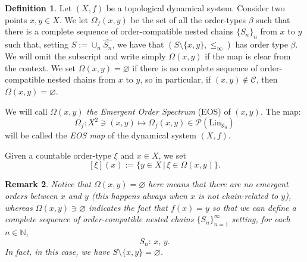 \documentclass[10pt,a4paper]{article}
\theoremstyle{definition}
\newtheorem{defi}{Definition}[section]
\theoremstyle{remark}
\theoremstyle{plain}
\newtheorem{rem}[defi]{Remark}
\begin{document}
\begin{defi}
    Let $(X,f)$ be a topological dynamical system. Consider two points $x,y\in X$. We let $\Omega_f(x,y)$ be the set of all the order-types $\beta$ such that there is a complete sequence of order-compatible nested chains $\{S_n\}_n$ from $x$ to $y$ such that, setting $S:=\cup_n \widehat{S_n}$, we have that $(S\setminus\{x,y\},\leq_\infty)$ has order type $\beta$. We will omit the subscript and write simply $\Omega(x,y)$ if the map is clear from the context. 
    We set $\Omega(x,y)=\varnothing$ if there is no complete sequence of order-compatible nested chains from $x$ to $y$, so in particular, if $(x,y)\notin\mathcal{C}$, then $\Omega(x,y)=\varnothing$.

    We will call $\Omega(x,y)$ \emph{the Emergent Order Spectrum} (EOS) of $(x,y)$.
    The map:
    \begin{equation}
        \Omega_f:X^2\ni (x,y)\mapsto \Omega_f(x,y)\in \mathcal{P}(\text{Lin}_{\aleph_0})
    \end{equation}
    will be called the \emph{EOS map} of the dynamical system $(X,f)$.

    Given a countable order-type $\xi$ and $x\in X$, we set $$[\xi](x):=\{y\in X\, |\, \xi\in\Omega(x,y)\}.$$

    
\end{defi}
\begin{rem}
    Notice that $\Omega(x,y)=\varnothing$ here means that there are no emergent orders between $x$ and $y$ (this happens always when $x$ is not chain-related to $y$), whereas $\Omega(x,y)\ni\varnothing$ indicates the fact that $f(x)=y$ so that we can define a complete sequence of order-compatible nested chains $\{S_n\}_{n=1}^{\infty}$ setting, for each $n\in\mathbb N$,
    $$S_n:\,x,\,y.$$
    In fact, in this case, we have $S\setminus\{x,y\}=\varnothing$.
\end{rem}
\end{document}
